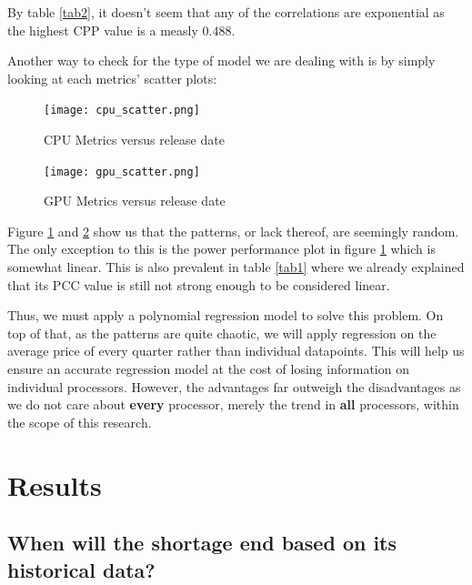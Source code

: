 \documentclass[conference]{IEEEtran}
\begin{document}
By table \ref{tab2}, it doesn't seem that any of the correlations are
exponential as the highest CPP value is a measly $0.488$.

Another way to check for the type of model we are dealing with is by simply
looking at each metrics' scatter plots:
\begin{figure}[htbp]
	\centerline{\texttt{[image: cpu\_scatter.png]}}
	\caption{CPU Metrics versus release date}
	\label{fig1}
\end{figure}
\begin{figure}[htbp]
	\centerline{\texttt{[image: gpu\_scatter.png]}}
	\caption{GPU Metrics versus release date}
	\label{fig2}
\end{figure}
Figure \ref{fig1} and \ref{fig2} show us that the patterns, or lack thereof,
are seemingly random. The only exception to this is the
power performance plot in figure \ref{fig1} which is somewhat linear. This
is also prevalent in table \ref{tab1} where we already explained that its
PCC value is still not strong enough to be considered linear.

Thus, we must apply a polynomial regression model to solve this problem. On
top of that, as the patterns are quite chaotic, we will apply regression on
the average price of every quarter rather than individual datapoints. This
will help us ensure an accurate regression model at the cost of losing
information on individual processors. However, the advantages far outweigh
the disadvantages as we do not care about \textbf{every} processor, merely the
trend in \textbf{all} processors, within the scope of this research.

\section{Results}
\subsection{When will the shortage end based on its historical data?}
\end{document}
